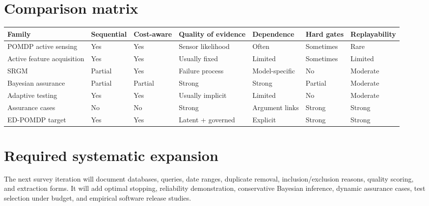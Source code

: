 \documentclass[11pt]{article}
\begin{document}
\section{Comparison matrix}
\begin{longtable}{p{}*{6}{p{}}}
\toprule Family & Sequential & Cost-aware & Quality of evidence & Dependence & Hard gates & Replayability\\\midrule
POMDP active sensing & Yes & Yes & Sensor likelihood & Often & Sometimes & Rare\\
Active feature acquisition & Yes & Yes & Usually fixed & Limited & Sometimes & Limited\\
SRGM & Partial & Yes & Failure process & Model-specific & No & Moderate\\
Bayesian assurance & Partial & Partial & Strong & Strong & Partial & Moderate\\
Adaptive testing & Yes & Yes & Usually implicit & Limited & No & Moderate\\
Assurance cases & No & No & Strong & Argument links & Strong & Strong\\
ED-POMDP target & Yes & Yes & Latent + governed & Explicit & Strong & Strong\\\bottomrule
\end{longtable}

\section{Required systematic expansion}
The next survey iteration will document databases, queries, date ranges, duplicate removal, inclusion/exclusion reasons, quality scoring, and extraction forms. It will add optimal stopping, reliability demonstration, conservative Bayesian inference, dynamic assurance cases, test selection under budget, and empirical software release studies.
\end{document}

